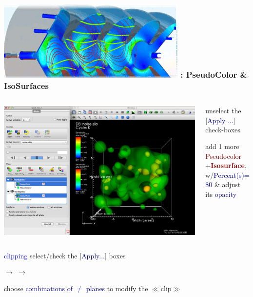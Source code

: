 \begin{frame}
\frametitle{\href{https://wci.llnl.gov/simulation/computer-codes/visit/}{\includegraphics[height=.85cm]{figs/visit-logos/VisIt-02}} \hspace{-.85cm}{\bf \textcolor{lightgray}{VisIt}}: PseudoColor \& IsoSurfaces}
\vspace{-1.5mm}
\begin{columns}%
\begin{column}{9cm}
        \centering
        \includegraphics[width=\columnwidth]{figs/visit-pract/VisIt_pseudocolor-isosurf_2}
\end{column}
\begin{column}{3cm}
        \pause
        \textcolor{DarkBlue}{}
        unselect the [\textcolor{DarkBlue}{Apply ...}] check-boxes

        \vspace{2mm}
        \textcolor{DarkBlue}{} add 1 more
                \textcolor{DarkRed}{Pseudocolor}
                +\textcolor{DarkRed}{\bf Isosurface},
        \\
        w/\textcolor{DarkBlue}{Percent(s)=80}
        \& adjust its
        \textcolor{DarkBlue}{opacity}
\end{column}
\end{columns}

\pause
\vspace{2mm}
\textcolor{DarkBlue}{}
        \textcolor{blue}{clipping}  select/check the [\textcolor{DarkBlue}{Apply...}] boxes

\textcolor{DarkBlue}{}
                $\rightarrow$ 
        $\rightarrow$ \framebox{\textcolor{DarkRed}{\bf Clip}}

        \hspace{5mm}
         choose \textcolor{DarkBlue}{combinations of $\ne$ planes} to modify the $\ll$clip$\gg$
\end{frame}






